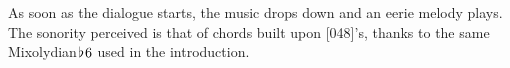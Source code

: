 As soon as the dialogue starts, the music drops down and an eerie melody plays. The sonority perceived is that of chords built upon [048]'s, thanks to the same Mixolydian\(\hspace*{0.18ex}\flat\hspace*{0.18ex}{6}\) used in the introduction. 

\clearpage


